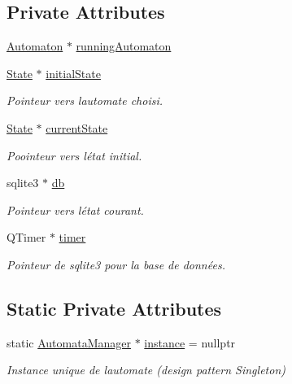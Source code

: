 \subsection*{Private Attributes}
\begin{DoxyCompactItemize}
\item 
\mbox{\hyperlink{class_automaton}{Automaton}} $\ast$ \mbox{\hyperlink{class_automata_manager_af344a9b75f263a737cf98b9f14dd2d4d}{running\+Automaton}}
\item 
\mbox{\hyperlink{class_state}{State}} $\ast$ \mbox{\hyperlink{class_automata_manager_aca1e971dc2f567a3bde4cdd1488aa64a}{initial\+State}}
\begin{DoxyCompactList}\small\item\em Pointeur vers l\textquotesingle{}automate choisi. \end{DoxyCompactList}\item 
\mbox{\hyperlink{class_state}{State}} $\ast$ \mbox{\hyperlink{class_automata_manager_ade5741f667ba5819cdd2621f502ae027}{current\+State}}
\begin{DoxyCompactList}\small\item\em Poointeur vers l\textquotesingle{}état initial. \end{DoxyCompactList}\item 
sqlite3 $\ast$ \mbox{\hyperlink{class_automata_manager_a81a9daff1e0a839798a30690324ae5bd}{db}}
\begin{DoxyCompactList}\small\item\em Pointeur vers l\textquotesingle{}état courant. \end{DoxyCompactList}\item 
Q\+Timer $\ast$ \mbox{\hyperlink{class_automata_manager_a8538c7cc33bb64483a2ae3ab49938049}{timer}}
\begin{DoxyCompactList}\small\item\em Pointeur de sqlite3 pour la base de données. \end{DoxyCompactList}\end{DoxyCompactItemize}
\subsection*{Static Private Attributes}
\begin{DoxyCompactItemize}
\item 
static \mbox{\hyperlink{class_automata_manager}{Automata\+Manager}} $\ast$ \mbox{\hyperlink{class_automata_manager_a2ea4e0a827dd9c14dac6fed45adccc19}{instance}} = nullptr
\begin{DoxyCompactList}\small\item\em Instance unique de l\textquotesingle{}automate (design pattern Singleton) \end{DoxyCompactList}\end{DoxyCompactItemize}
